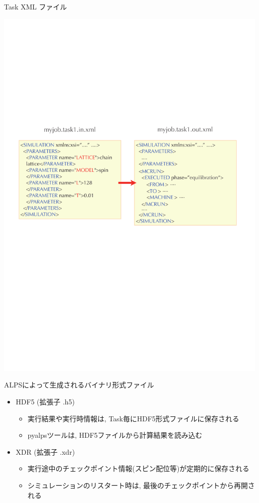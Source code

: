 \begin{frame}{Task XML ファイル}
  \begin{center}
    \includegraphics[height=.6\textheight]{simulation3.pdf}
  \end{center}
\end{frame}

\begin{frame}{ALPSによって生成されるバイナリ形式ファイル}
  \begin{itemize}
    \setlength{\itemsep}{1em}
  \item HDF5 (拡張子 {.h5})
    \begin{itemize}
    \item 実行結果や実行時情報は, Task毎にHDF5形式ファイルに保存される
    \item pyalpsツールは, HDF5ファイルから計算結果を読み込む
    \end{itemize}
  \item XDR (拡張子 {.xdr})
    \begin{itemize}
    \item 実行途中のチェックポイント情報(スピン配位等)が定期的に保存される
    \item シミュレーションのリスタート時は, 最後のチェックポイントから再開される
    \end{itemize}
  \end{itemize}
\end{frame}

